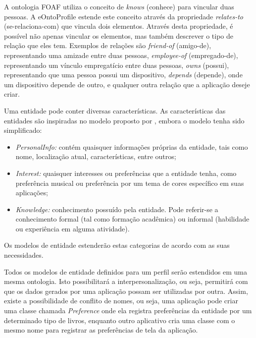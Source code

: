 A ontologia FOAF \cite{foaf} utiliza o conceito de {\em knows} (conhece) para vincular duas pessoas. A eOntoProfile estende este conceito através da propriedade {\em relates-to} (se-relaciona-com) que vincula dois elementos. Através desta propriedade, é possível não apenas vincular os elementos, mas também descrever o tipo de relação que eles tem. Exemplos de relações são {\em friend-of} (amigo-de), representando uma amizade entre duas pessoas, {\em employee-of} (empregado-de), representando um vínculo empregatício entre duas pessoas, {\em owns} (possui), representando que uma pessoa possui um dispositivo, {\em depends} (depende), onde um dispositivo depende de outro, e qualquer outra relação que a aplicação deseje criar.

Uma entidade pode conter diversas características. As características das entidades são inspiradas no modelo proposto por , embora o modelo tenha sido simplificado:
 
\begin{itemize}

  \item {\em PersonalInfo:} contém quaisquer informações próprias da entidade, tais como nome, localização atual, características, entre outros;

  \item {\em Interest:} quaisquer interesses ou preferências que a entidade tenha, como preferência musical ou preferência por um tema de cores específico em suas aplicações;

  \item {\em Knowledge:} conhecimento possuído pela entidade. Pode referir-se a conhecimento formal (tal como formação acadêmica) ou informal (habilidade ou experiência em alguma atividade).

\end{itemize}

Os modelos de entidade estenderão estas categorias de acordo com as suas necessidades.

Todos os modelos de entidade definidos para um perfil serão estendidos em uma mesma ontologia. Isto possibilitará a interpersonalização, ou seja, permitirá com que os dados gerados por uma aplicação possam ser utilizadas por outra. Assim, existe a possibilidade de conflito de nomes, ou seja, uma aplicação pode criar uma classe chamada {\em Preference} onde ela registra preferências da entidade por um determinado tipo de livros, enquanto outro aplicativo cria uma classe com o mesmo nome para registrar as preferências de tela da aplicação.

